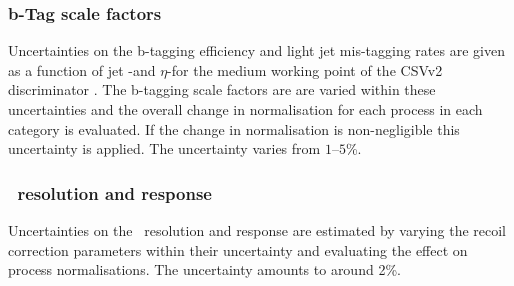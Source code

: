 \subsubsection*{b-Tag scale factors}
Uncertainties on the b-tagging efficiency and light jet mis-tagging
rates are given as a function of jet \pT-and $\eta$-for the 
medium working point of the \ac{CSV}v2 discriminator \cite{cms-btag-run2}.
The b-tagging scale factors are are varied within these uncertainties
and the overall change in normalisation for each process in each category is
evaluated. If the change in normalisation is non-negligible this
uncertainty is applied. The uncertainty varies from $1$--$5$\%.
\subsubsection*{\MET~resolution and response}
Uncertainties on the \MET~resolution and response are estimated
by varying the recoil correction parameters within their
uncertainty and evaluating the effect on process
normalisations. The uncertainty amounts to around 2\%.
